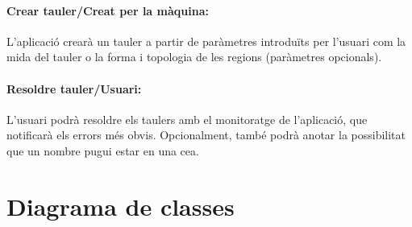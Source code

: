 \documentclass[a4paper,12pt]{article}
\begin{document}
\paragraph{Crear tauler/Creat per la màquina:}
L'aplicació crearà un tauler a partir de paràmetres introduïts per l'usuari com la mida del tauler o la forma i topologia de les regions (paràmetres opcionals).

\paragraph{Resoldre tauler/Usuari:}
L'usuari podrà resoldre els taulers amb el monitoratge de l'aplicació, que notificarà els errors més obvis. Opcionalment, també podrà anotar la possibilitat que un nombre pugui estar en una ce\lgem a.

\newpage
\section{Diagrama de classes}
\end{document}

